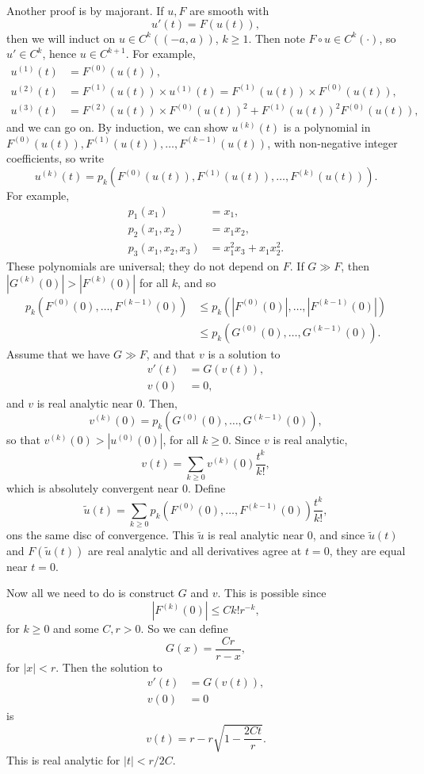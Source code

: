 \documentclass[12pt]{article}
\begin{document}
\begin{proofbox}
	Another proof is by majorant. If $u, F$ are smooth with
	\[
	u'(t) = F(u(t)),
	\]
	then we will induct on $u \in C^k((-a, a))$, $k \geq 1$. Then note $F \circ u \in C^k(\cdot)$, so $u' \in C^k$, hence $u \in C^{k+1}$. For example,
	\begin{align*}
		u^{(1)}(t) &= F^{(0)}(u(t)), \\
		u^{(2)}(t) &= F^{(1)}(u(t)) \times u^{(1)}(t) = F^{(1)}(u(t)) \times F^{(0)}(u(t)), \\
		u^{(3)}(t) &= F^{(2)}(u(t)) \times F^{(0)}(u(t))^2 + F^{(1)}(u(t))^2 F^{(0)}(u(t)),
	\end{align*}
	and we can go on. By induction, we can show $u^{(k)}(t)$ is a polynomial in $F^{(0)}(u(t)), F^{(1)}(u(t)), \ldots, F^{(k-1)}(u(t))$, with non-negative integer coefficients, so write
	\[
	u^{(k)}(t) = p_k(F^{(0)}(u(t)), F^{(1)}(u(t)), \ldots, F^{(k)}(u(t))).
	\]
	For example,
	\begin{align*}
		p_1(x_1) &= x_1, \\
		p_2(x_1, x_2) &= x_1 x_2, \\
		p_3(x_1, x_2, x_3) &= x_1^2 x_3 + x_1x_2^2.
	\end{align*}
	These polynomials are universal; they do not depend on $F$. If $G \gg F$, then $|G^{(k)}(0)| > |F^{(k)}(0)|$ for all $k$, and so
	\begin{align*}
		p_k(F^{(0)}(0), \ldots, F^{(k-1)}(0)) &\leq p_k(|F^{(0)}(0)|, \ldots, |F^{(k-1)}(0)|) \\
						      &\leq p_k(G^{(0)}(0), \ldots, G^{(k-1)}(0)).
	\end{align*}
	Assume that we have $G \gg F$, and that $v$ is a solution to
	\begin{align*}
		v'(t) &= G(v(t)), \\
		v(0) &= 0,
	\end{align*}
	and $v$ is real analytic near $0$. Then,
	\[
	v^{(k)}(0) = p_k(G^{(0)}(0), \ldots, G^{(k-1)}(0)),
	\]
	so that $v^{(k)}(0) > |u^{(0)}(0)|$, for all $k \geq 0$. Since $v$ is real analytic,
	\[
	v(t) = \sum_{k \geq 0} v^{(k)}(0) \frac{t^k}{k!},
	\]
	which is absolutely convergent near $0$. Define
	\[
	\tilde u(t) = \sum_{k \geq 0} p_k(F^{(0)}(0), \ldots, F^{(k-1)}(0)) \frac{t^k}{k!},
	\]
	ons the same disc of convergence. This $\tilde u$ is real analytic near $0$, and since $\tilde u(t)$ and $F(\tilde u(t))$ are real analytic and all derivatives agree at $t = 0$, they are equal near $t = 0$.

	Now all we need to do is construct $G$ and $v$. This is possible since
	\[
	|F^{(k)}(0)| \leq C k! r^{-k},
	\]
	for $k \geq 0$ and some $C, r > 0$. So we can define
	\[
	G(x) = \frac{Cr}{r - x},
	\]
	for $|x| < r$. Then the solution to
	\begin{align*}
		v'(t) &= G(v(t)), \\
		v(0) &= 0
	\end{align*}
	is
	\[
		v(t) = r - r \sqrt{1 - \frac{2 C t}{r}}.
	\]
	This is real analytic for $|t| < r/2C$.
\end{proofbox}


\newpage

\printindex
\end{document}
